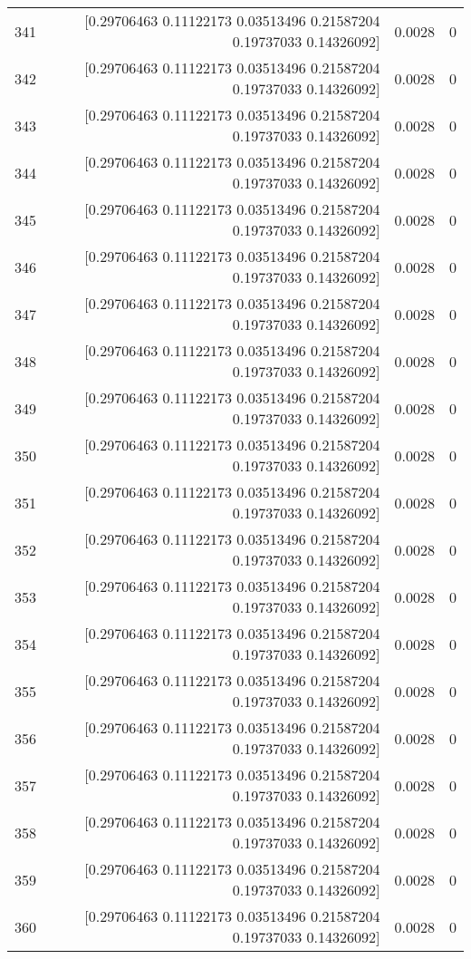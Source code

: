 \begin{longtable}{lrrr}
341 & [0.29706463 0.11122173 0.03513496 0.21587204 0.19737033 0.14326092] & 0.0028 & 0 \\
342 & [0.29706463 0.11122173 0.03513496 0.21587204 0.19737033 0.14326092] & 0.0028 & 0 \\
343 & [0.29706463 0.11122173 0.03513496 0.21587204 0.19737033 0.14326092] & 0.0028 & 0 \\
344 & [0.29706463 0.11122173 0.03513496 0.21587204 0.19737033 0.14326092] & 0.0028 & 0 \\
345 & [0.29706463 0.11122173 0.03513496 0.21587204 0.19737033 0.14326092] & 0.0028 & 0 \\
346 & [0.29706463 0.11122173 0.03513496 0.21587204 0.19737033 0.14326092] & 0.0028 & 0 \\
347 & [0.29706463 0.11122173 0.03513496 0.21587204 0.19737033 0.14326092] & 0.0028 & 0 \\
348 & [0.29706463 0.11122173 0.03513496 0.21587204 0.19737033 0.14326092] & 0.0028 & 0 \\
349 & [0.29706463 0.11122173 0.03513496 0.21587204 0.19737033 0.14326092] & 0.0028 & 0 \\
350 & [0.29706463 0.11122173 0.03513496 0.21587204 0.19737033 0.14326092] & 0.0028 & 0 \\
351 & [0.29706463 0.11122173 0.03513496 0.21587204 0.19737033 0.14326092] & 0.0028 & 0 \\
352 & [0.29706463 0.11122173 0.03513496 0.21587204 0.19737033 0.14326092] & 0.0028 & 0 \\
353 & [0.29706463 0.11122173 0.03513496 0.21587204 0.19737033 0.14326092] & 0.0028 & 0 \\
354 & [0.29706463 0.11122173 0.03513496 0.21587204 0.19737033 0.14326092] & 0.0028 & 0 \\
355 & [0.29706463 0.11122173 0.03513496 0.21587204 0.19737033 0.14326092] & 0.0028 & 0 \\
356 & [0.29706463 0.11122173 0.03513496 0.21587204 0.19737033 0.14326092] & 0.0028 & 0 \\
357 & [0.29706463 0.11122173 0.03513496 0.21587204 0.19737033 0.14326092] & 0.0028 & 0 \\
358 & [0.29706463 0.11122173 0.03513496 0.21587204 0.19737033 0.14326092] & 0.0028 & 0 \\
359 & [0.29706463 0.11122173 0.03513496 0.21587204 0.19737033 0.14326092] & 0.0028 & 0 \\
360 & [0.29706463 0.11122173 0.03513496 0.21587204 0.19737033 0.14326092] & 0.0028 & 0 \\

\end{longtable}
